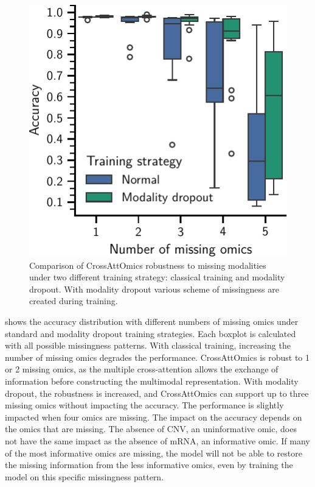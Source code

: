 \documentclass[../main.tex]{subfiles}
\begin{document}
		\begin{figure}
			\centering
			\vspace{-0.8\intextsep}
			\includegraphics{robustness_missing_modalities_dropout.pdf}
			\caption[CrossAttOmics robustness to missing modalities]{Comparison of CrossAttOmics robustness to missing modalities under two different training strategy: classical training and modality dropout. With modality dropout various scheme of missingness are created during training.}\label{fig:modality_dropout}
		\end{figure}
		 shows the accuracy distribution with different numbers of missing omics under standard and modality dropout training strategies.
		Each boxplot is calculated with all possible missingness patterns.
		With classical training, increasing the number of missing omics degrades the performance.
		CrossAttOmics is robust to 1 or 2 missing omics, as the multiple cross-attention allows the exchange of information before constructing the multimodal representation.
		With modality dropout, the robustness is increased, and CrossAttOmics can support up to three missing omics without impacting the accuracy.
		The performance is slightly impacted when four omics are missing.
		The impact on the accuracy depends on the omics that are missing.
		The absence of CNV, an uninformative omic, does not have the same impact as the absence of mRNA, an informative omic.
		If many of the most informative omics are missing, the model will not be able to restore the missing information from the less informative omics, even by training the model on this specific missingness pattern.
\end{document}
